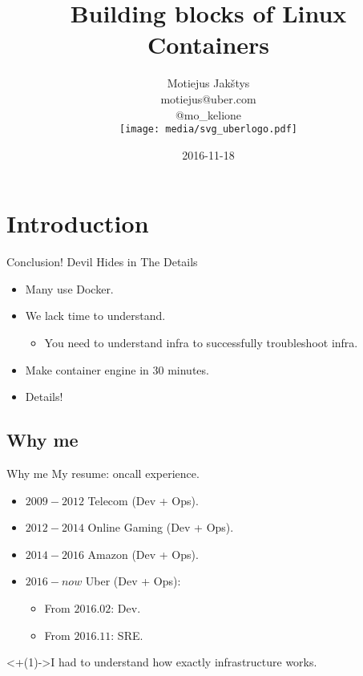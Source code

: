 \documentclass[14pt]{beamer}
\title{Building blocks of Linux Containers}
\author{Motiejus Jak\v{s}tys \\
    motiejus@uber.com \\
    @mo\_kelione \\
    \vspace{1em}
    \texttt{[image: media/svg\_uberlogo.pdf]}
}
\date{2016-11-18}
\begin{document}

\begin{frame}
\titlepage
\end{frame}

\section{Introduction}

\begin{frame}{Conclusion!}
    \pause
    Devil Hides in The Details
    \begin{itemize}[<+->]
        \item Many use Docker.
        \item We lack time to understand.
            \begin{itemize}
                \item You need to understand infra to successfully troubleshoot infra.
            \end{itemize}
        \item Make container engine in 30 minutes.
        \item Details! 
    \end{itemize}
\end{frame}

\subsection{Why me}
\begin{frame}{Why me}
    My resume: {\tiny oncall experience.}
    \begin{itemize}
        \item $2009-2012$ Telecom (Dev + Ops).
        \item $2012-2014$ Online Gaming (Dev + Ops).
        \item $2014-2016$ Amazon (Dev + Ops).
        \item $2016-now$ Uber (Dev + Ops):
            \begin{itemize}
                \item From $2016.02$: Dev.
                \item From $2016.11$: SRE.
            \end{itemize}
    \end{itemize}
    \onslide<+(1)->{I had to understand how exactly infrastructure works.}
\end{frame}
\end{document}

